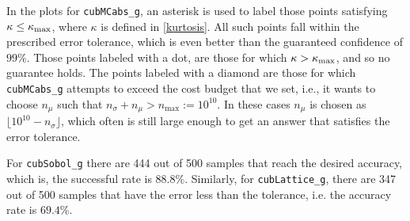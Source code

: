 \documentclass{iitthesis}
\theoremstyle{definition}
\begin{document}
In the plots for {\tt cubMCabs\_g}, an asterisk is used to label those points satisfying $\kappa \le \kappa_{\max}$, where $\kappa$ is defined in \eqref{kurtosis}. All such points fall within the prescribed error tolerance,
which is even better than the guaranteed confidence of $99\%$.  Those points labeled with a dot, are those for which $\kappa > \kappa_{\max}$, and so no guarantee holds. The points labeled with a diamond are those for which  {\tt cubMCabs\_g}  attempts to exceed the cost budget that we set, i.e., it wants to choose $n_\mu$ such that $n_{\sigma}+n_\mu > n_{\max}:=10^{10}$. In these cases $n_\mu$ is chosen as $\lfloor 10^{10} - n_\sigma \rfloor$, which often is still large enough to get an answer that satisfies the error tolerance. 
 
For {\tt cubSobol\_g} there are 444 out of 500 samples that reach the desired accuracy, which is, the successful rate is $88.8\%$. Similarly, for {\tt cubLattice\_g}, there are 347 out of 500 samples that have the error less than the tolerance, i.e. the accuracy rate is $69.4\%$.

\label{subsec:meanmcabssinglehump}
\end{document}
